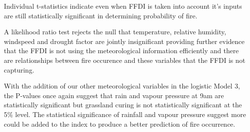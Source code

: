 \documentclass[11pt,a4paper]{article}
\begin{document}
Individual t-statistics indicate even when FFDI is taken into account it's inputs are still statistically significant in determining probability of fire. 

A likelihood ratio test rejects the null that temperature, relative humidity, windspeed and drought factor are jointly insignificant providing further evidence that the FFDI is not using the meteorological information efficiently and there are relationships between fire occurence and these variables that the FFDI is not capturing.


With the addition of our other meteorological variables in the logistic Model 3, the P-values once again suggest that rain and vapour pressure at 9am are statistically significant but grassland curing is not statistically significant at the 5\% level. The statistical significance of rainfall and vapour pressure suggest more could be added to the index to produce a better prediction of fire occurrence. 
\end{document}
